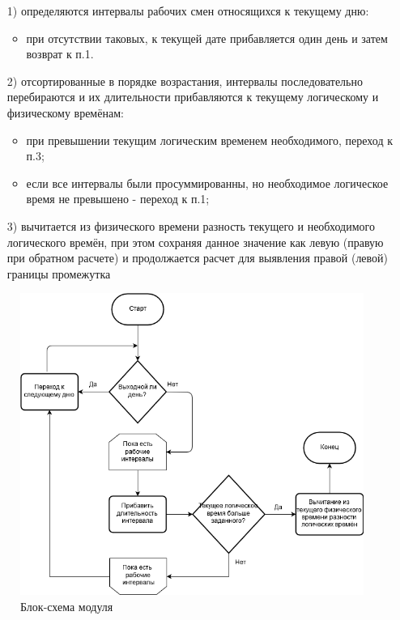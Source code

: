 \begin{enumerate}
	\item[1)] определяются интервалы рабочих смен относящихся к текущему дню:
	      \begin{itemize}
		      \item при отсутствии таковых, к текущей дате прибавляется один день и затем возврат к п.1.
	      \end{itemize}
	\item[2)] отсортированные в порядке возрастания, интервалы последовательно перебираются и их длительности прибавляются к текущему логическому и физическому времёнам:
	      \begin{itemize}
		      \item при превышении текущим логическим временем необходимого, переход к п.3;
		      \item если все интервалы были просуммированны, но необходимое логическое время не превышено - переход к п.1;
	      \end{itemize}
	\item[3)] вычитается из физического времени разность текущего и необходимого логического времён, при этом сохраняя данное значение как левую (правую при обратном расчете) и продолжается расчет для выявления правой (левой) границы промежутка
\end{enumerate}

\begin{figure}[h]
	\includegraphics[width=\linewidth]{pics/scheduleSchema.png}
	\caption{Блок-схема модуля}
	\label{fig:schema}
	\centering
\end{figure}

